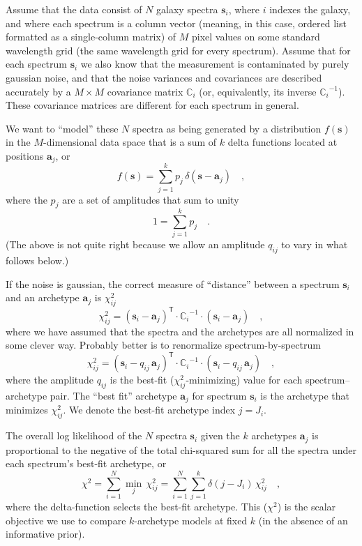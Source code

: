 \documentclass[12pt]{article}
\newcommand{\ampj}{p_j}
\newcommand{\ampij}{q_{ij}}
\newcommand{\chisq}{\chi^2}
\newcommand{\chisqij}{\chisq_{ij}}
\newcommand{\Mvector}[1]{\mathbf{#1}}
\newcommand{\point}{\Mvector{s}}
\newcommand{\spectrumi}{\point_i}
\newcommand{\archetypej}{\Mvector{a}_j}
\newcommand{\Mmatrix}[1]{\mathbb{#1}}
\newcommand{\covari}{\Mmatrix{C}_i}
\newcommand{\inverse}[1]{{#1}^{-1}}
\newcommand{\invcovari}{\inverse{\covari}}
\newcommand{\transpose}[1]{{#1}^{\mathsf{T}}}
\newcommand{\minover}[1]{\min_{#1}\,}
\begin{document}
Assume that the data consist of $N$ galaxy spectra $\spectrumi$, where
$i$ indexes the galaxy, and where each spectrum is a column vector
(meaning, in this case, ordered list formatted as a single-column
matrix) of $M$ pixel values on some standard wavelength grid (the same
wavelength grid for every spectrum).  Assume that for each spectrum
$\spectrumi$ we also know that the measurement is contaminated by
purely gaussian noise, and that the noise variances and covariances
are described accurately by a $M\times M$ covariance matrix $\covari$
(or, equivalently, its inverse $\invcovari$).  These covariance
matrices are different for each spectrum in general.

We want to ``model'' these $N$ spectra as being generated by a
distribution $f(\point)$ in the $M$-dimensional data space that is a
sum of $k$ delta functions located at positions $\archetypej$, or
\begin{equation}
f(\point) = \sum_{j=1}^{k} \ampj\,\delta(\point-\archetypej) \quad ,
\end{equation}
where the $\ampj$ are a set of amplitudes that sum to unity
\begin{equation}
1 = \sum_{j=1}^{k} \ampj \quad .
\end{equation}
(The above is not quite right because we allow an amplitude $\ampij$
to vary in what follows below.)

If the noise is gaussian, the correct measure of ``distance'' between
a spectrum $\spectrumi$ and an archetype $\archetypej$ is $\chisqij$
\begin{equation}
\chisqij = \transpose{(\spectrumi-\archetypej)}
           \cdot\invcovari\cdot(\spectrumi-\archetypej) \quad ,
\end{equation}
where we have assumed that the spectra and the archetypes are all
normalized in some clever way.  Probably better is to renormalize
spectrum-by-spectrum
\begin{equation}
\chisqij = \transpose{(\spectrumi-\ampij\,\archetypej)}
           \cdot\invcovari\cdot(\spectrumi-\ampij\,\archetypej) \quad ,
\end{equation}
where the amplitude $\ampij$ is the best-fit ($\chisqij$-minimizing)
value for each spectrum--archetype pair.  The ``best fit'' archetype
$\archetypej$ for spectrum $\spectrumi$ is the archetype that
minimizes $\chisqij$.  We denote the best-fit archetype index $j=J_i$.

The overall log likelihood of the $N$ spectra $\spectrumi$ given the
$k$ archetypes $\archetypej$ is proportional to the negative of the
total chi-squared sum for all the spectra under each spectrum's
best-fit archetype, or
\begin{equation}
\chisq = \sum_{i=1}^{N} \minover{j}\chisqij
       = \sum_{i=1}^{N}\sum_{j=1}^{k} \delta(j-J_i)\,\chisqij \quad ,
\end{equation}
where the delta-function selects the best-fit archetype.  This
($\chisq$) is the scalar objective we use to compare $k$-archetype
models at fixed $k$ (in the absence of an informative prior).
\end{document}
